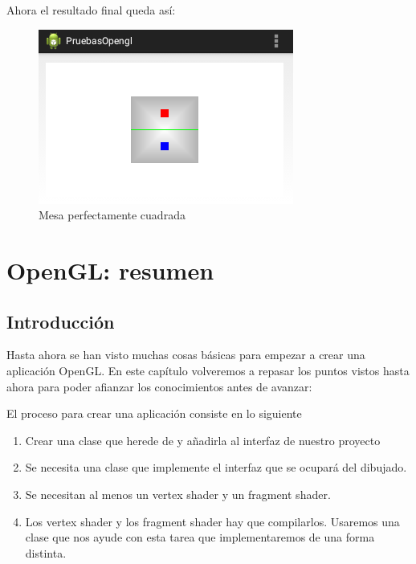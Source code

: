 \documentclass[a4paper,12pt,spanish]{sphinxmanual}
\begin{document}
Ahora el resultado final queda así:
\begin{figure}[htbp]
\centering
\capstart

\includegraphics{capturajuegoproyectado.png}
\caption{Mesa perfectamente cuadrada}\end{figure}


\chapter{OpenGL: resumen}
\label{cap6resumen:opengl-resumen}\label{cap6resumen::doc}

\section{Introducción}
\label{cap6resumen:introduccion}
Hasta ahora se han visto muchas cosas básicas para empezar a crear una aplicación OpenGL. En este capítulo volveremos a repasar los puntos vistos hasta ahora para poder afianzar los conocimientos antes de avanzar:

El proceso para crear una aplicación consiste en lo siguiente
\begin{enumerate}
\item {} 
Crear una clase que herede de  y añadirla al interfaz de nuestro proyecto

\item {} 
Se necesita una clase que implemente el interfaz  que se ocupará del dibujado.

\item {} 
Se necesitan al menos un vertex shader y un fragment shader.

\item {} 
Los vertex shader y los fragment shader hay que compilarlos. Usaremos una clase que nos ayude con esta tarea que implementaremos de una forma distinta.

\end{enumerate}
\end{document}
